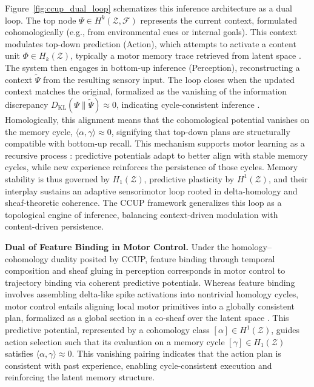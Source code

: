 \documentclass[lettersize,journal]{IEEEtran}
\begin{document}
Figure~\ref{fig:ccup_dual_loop} schematizes this inference architecture as a dual loop. The top node \( \Psi \in H^k(\mathcal{Z}, \mathcal{F}) \) represents the current context, formulated cohomologically (e.g., from environmental cues or internal goals). This context modulates top-down prediction (Action), which attempts to activate a content unit \( \Phi \in H_k(\mathcal{Z}) \), typically a motor memory trace retrieved from latent space \cite{sohn2021network}. The system then engages in bottom-up inference (Perception), reconstructing a context \( \tilde{\Psi} \) from the resulting sensory input. The loop closes when the updated context matches the original, formalized as the vanishing of the information discrepancy \( D_{\mathrm{KL}}(\Psi \| \tilde{\Psi}) \approx 0 \), indicating cycle-consistent inference \cite{keller2018predictive}.
Homologically, this alignment means that the cohomological potential vanishes on the memory cycle, \( \langle \alpha, \gamma \rangle \approx 0 \), signifying that top-down plans are structurally compatible with bottom-up recall. This mechanism supports motor learning as a recursive process \cite{todorov2002optimal}: predictive potentials adapt to better align with stable memory cycles, while new experience reinforces the persistence of those cycles. Memory stability is thus governed by \( H_1(\mathcal{Z}) \), predictive plasticity by \( H^1(\mathcal{Z}) \), and their interplay sustains an adaptive sensorimotor loop rooted in delta-homology and sheaf-theoretic coherence. The CCUP framework generalizes this loop as a topological engine of inference, balancing context-driven modulation with content-driven persistence.

\noindent\textbf{Dual of Feature Binding in Motor Control.}
Under the homology–cohomology duality posited by CCUP, feature binding through temporal composition and sheaf gluing in perception corresponds in motor control to trajectory binding via coherent predictive potentials. Whereas feature binding involves assembling delta-like spike activations into nontrivial homology cycles, motor control entails aligning local motor primitives into a globally consistent plan, formalized as a global section in a co-sheaf over the latent space \cite{prinz1997perception}. This predictive potential, represented by a cohomology class \( [\alpha] \in H^1(\mathcal{Z}) \), guides action selection such that its evaluation on a memory cycle \( [\gamma] \in H_1(\mathcal{Z}) \) satisfies \( \langle \alpha, \gamma \rangle \approx 0 \). This vanishing pairing indicates that the action plan is consistent with past experience, enabling cycle-consistent execution and reinforcing the latent memory structure.
\end{document}
